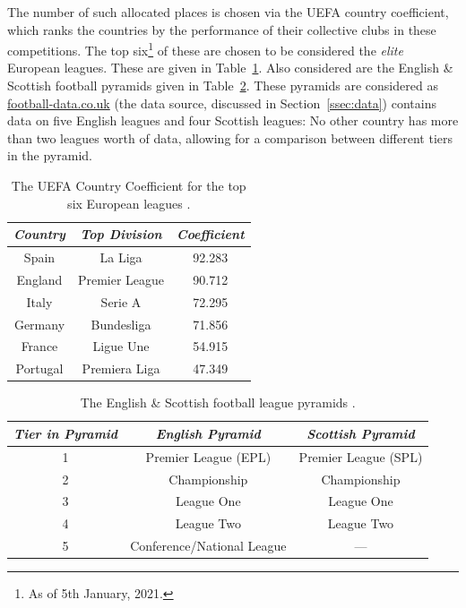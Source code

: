 \documentclass[a4paper,10pt]{report}
\begin{document}
The number of such allocated places is chosen via the UEFA country coefficient, which ranks the countries by the performance of their collective clubs in these competitions. The top six\footnote{As of 5th January, 2021.} of these are chosen to be considered the \emph{elite} European leagues. These are given in Table~\ref{tab:eliteleagues}. Also considered are the English \& Scottish football pyramids given in Table~\ref{tab:engscoleagues}. These pyramids are considered as \url{football-data.co.uk} (the data source, discussed in Section~\ref{ssec:data}) contains data on five English leagues and four Scottish leagues: No other country has more than two leagues worth of data, allowing for a comparison between different tiers in the pyramid.

\begin{table}[h!]\begin{center}\begin{tabular}{c|c|c}
	\emph{Country} 	& \emph{Top Division} 	& \emph{Coefficient}\\\hline
	Spain 			& La Liga 				& 92.283\\
	England 		& Premier League 		& 90.712\\
	Italy 			& Serie A 				& 72.295\\
	Germany 		& Bundesliga 			& 71.856 \\
	France 			& Ligue Une 			& 54.915\\
	Portugal		& Premiera Liga 		& 47.349
\end{tabular}\end{center}\caption{The UEFA Country Coefficient for the top six European leagues \autocite{UefaCoeffs}.}\label{tab:eliteleagues}\end{table}

\begin{table}[h!]\begin{center}\begin{tabular}{c|c|c}
	\emph{Tier in Pyramid}	& \emph{English Pyramid}	& \emph{Scottish Pyramid}\\\hline
	1 						& Premier League (EPL) 		& Premier League (SPL)\\
	2 						& Championship 				& Championship\\
	3 						& League One				& League One\\
	4 						& League Two 				& League Two\\
	5 						& Conference/National League& --- \\
\end{tabular}\end{center}\caption{The English \& Scottish football league pyramids \autocite{EngLeagues, ScoLeagues}.}\label{tab:engscoleagues}\end{table}
\end{document}
